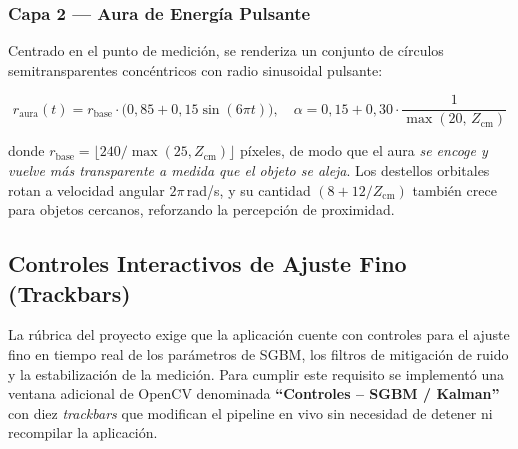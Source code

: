 \documentclass[12pt, a4paper]{article}
\begin{document}
\subsubsection*{Capa 2 — Aura de Energía Pulsante}

Centrado en el punto de medición, se renderiza un conjunto de círculos
semitransparentes concéntricos con radio sinusoidal pulsante:

\begin{equation}
  r_{\text{aura}}(t) = r_{\text{base}} \cdot \bigl(0{,}85 + 0{,}15\sin(6\pi t)\bigr),
  \quad
  \alpha = 0{,}15 + 0{,}30 \cdot \frac{1}{\max(20,\, Z_{\text{cm}})}
\end{equation}

donde $r_{\text{base}} = \lfloor 240 / \max(25, Z_{\text{cm}}) \rfloor$ píxeles,
de modo que el aura \emph{se encoge y vuelve más transparente a medida que el objeto
se aleja}. Los destellos orbitales rotan a velocidad angular $2\pi$\,rad/s, y su
cantidad $(8 + 12/Z_{\text{cm}})$ también crece para objetos cercanos, reforzando
la percepción de proximidad.

\subsection{Controles Interactivos de Ajuste Fino (Trackbars)}

La rúbrica del proyecto exige que la aplicación cuente con controles para el
ajuste fino en tiempo real de los parámetros de SGBM, los filtros de mitigación
de ruido y la estabilización de la medición. Para cumplir este requisito se
implementó una ventana adicional de OpenCV denominada \textbf{``Controles –
SGBM / Kalman''} con diez \emph{trackbars} que modifican el pipeline en vivo
sin necesidad de detener ni recompilar la aplicación.
\end{document}
